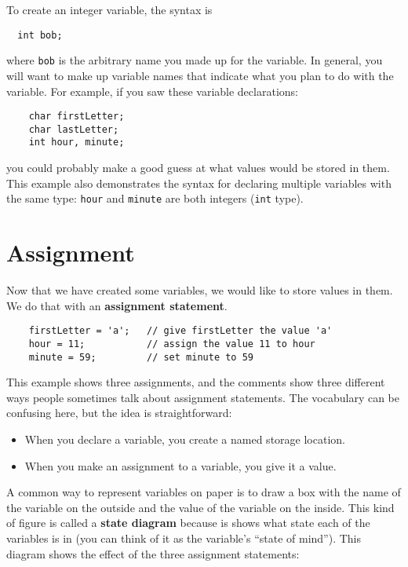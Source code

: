 
To create an integer variable, the syntax is 

\begin{lstlisting}
  int bob;
\end{lstlisting}
%
where {\tt bob} is the arbitrary name you made up for the
variable.  In general, you will want to make up variable names
that indicate what you plan to do with the variable.  For
example, if you saw these variable declarations:

\begin{lstlisting}
    char firstLetter;
    char lastLetter;
    int hour, minute;
\end{lstlisting}
%
you could probably make a good guess at what values
would be stored in them.  This example
also demonstrates the syntax for declaring multiple variables
with the same type: {\tt hour} and {\tt minute}
are both integers ({\tt int} type).

\section{Assignment}

Now that we have created some variables, we would like to
store values in them.  We do that with an {\bf assignment
statement}.

\begin{lstlisting}
    firstLetter = 'a';   // give firstLetter the value 'a'
    hour = 11;           // assign the value 11 to hour
    minute = 59;         // set minute to 59
\end{lstlisting}
%
This example shows three assignments, and the comments show
three different ways people sometimes talk about assignment
statements.  The vocabulary can be confusing here, but the
idea is straightforward:

\begin{itemize}

\item When you declare a variable, you create a named storage location.

\item When you make an assignment to a variable, you give it a value.

\end{itemize}

A common way to represent variables on paper is to draw a box
with the name of the variable on the outside and the value
of the variable on the inside.  This kind of figure is called
a {\bf state diagram} because is shows what state each of the
variables is in (you can think of it as the variable's ``state of
mind'').
This diagram shows
the effect of the three assignment statements:


